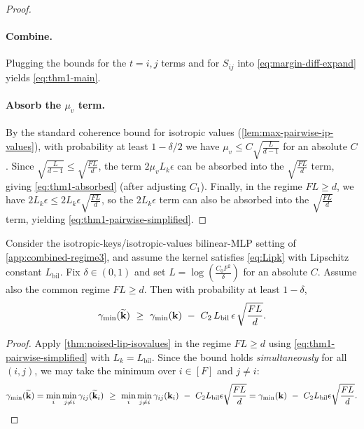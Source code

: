 \begin{proof}
\paragraph{Combine.}
Plugging the bounds for the $t=i,j$ terms and for $S_{ij}$ into \cref{eq:margin-diff-expand} yields \cref{eq:thm1-main}.

\paragraph{Absorb the $\mu_{v}$ term.}
By the standard coherence bound for isotropic values (\cref{lem:max-pairwise-ip-values}),
with probability at least $1-\delta/2$ we have $\mu_{v}\le C\sqrt{\tfrac{L}{d-1}}$ for an absolute $C$.
Since $\sqrt{\tfrac{L}{d-1}}\le \sqrt{\tfrac{FL}{d}}$, the term $2\mu_{v} L_{k}\epsilon$ can be absorbed into the
$\sqrt{\tfrac{FL}{d}}$ term, giving \cref{eq:thm1-absorbed} (after adjusting $C_{1}$).
Finally, in the regime $FL\ge d$, we have $2L_{k}\epsilon\le 2L_{k}\epsilon\sqrt{\tfrac{FL}{d}}$, so the
$2L_{k}\epsilon$ term can also be absorbed into the $\sqrt{\tfrac{FL}{d}}$ term, yielding \cref{eq:thm1-pairwise-simplified}.
\end{proof}

\begin{corollary}
\label{cor:noised-bilinear}
Consider the isotropic-keys/isotropic-values bilinear-MLP setting of \cref{app:combined-regime3},
and assume the kernel satisfies \cref{eq:Lipk} with Lipschitz constant $L_{\mathrm{bil}}$.
Fix $\delta\in(0,1)$ and set $L=\log(\tfrac{C_{0} F^2}{\delta})$ for an absolute $C$.
Assume also the common regime $FL\ge d$.
Then with probability at least $1-\delta$,
\begin{equation}
\gamma_{\min}(\widetilde{{\mathbf{k}}})
\ \ge\
\gamma_{\min}({\mathbf{k}})
\ -\ C_{\mathrm{2}}\,L_{\mathrm{bil}}\,\epsilon\,\sqrt{\frac{FL}{d}}.
\label{eq:thm1-simplified}
\end{equation}
\end{corollary}

\begin{proof}
Apply \cref{thm:noised-lip-isovalues} in the regime $FL\ge d$ using \cref{eq:thm1-pairwise-simplified} with $L_{k}=L_{\mathrm{bil}}$.
Since the bound holds \emph{simultaneously} for all $(i,j)$, we may take the minimum over $i\in[F]$ and $j\neq i$:
\[
\gamma_{\min}(\widetilde{\vk})
=\min_{i}\min_{j\neq i}\gamma_{ij}(\widetilde{\vk}_{i})
\ \ge\
\min_{i}\min_{j\neq i}\gamma_{ij}(\vk_{i})\ -\ C_{\mathrm{2}}L_{\mathrm{bil}}\epsilon\sqrt{\frac{FL}{d}}
=\gamma_{\min}(\vk)\ -\ C_{\mathrm{2}}L_{\mathrm{bil}}\epsilon\sqrt{\frac{FL}{d}}.
\]
\end{proof}

